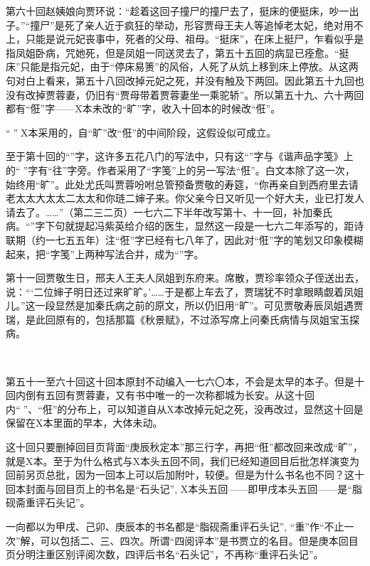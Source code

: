 \par 第六十回赵姨娘向贾环说：“趁着这回子撞尸的撞尸去了，挺床的便挺床，吵一出子。”“撞尸”是死了亲人近于疯狂的举动，形容贾母王夫人等追悼老太妃，绝对用不上，只能是说元妃丧事中，死者的父母、祖母。“挺床”，在床上挺尸，乍看似乎是指凤姐卧病，咒她死，但是凤姐一同送灵去了，第五十五回的病显已痊愈。“挺床”只能是指元妃，由于“停床易箦”的风俗，人死了从炕上移到床上停放。从这两句对白上看来，第五十八回改掉元妃之死，并没有触及下两回。因此第五十九回也没有改掉贾蓉妻，仍旧有“贾母带着贾蓉妻坐一乘驼轿”。所以第五十九、六十两回都有“俇”字——X本未改的“旷”字，收入十回本的时候改“俇”。
\par “𤞘”是X本采用的，自“旷”改“俇”的中间阶段，这假设似可成立。
\par 至于第十回的“\QuanWang ”字，这许多五花八门的写法中，只有这“\QuanWang ”字与《谐声品字笺》上的“𠉫”字有“往”字旁。作者采用了“字笺”上的另一写法“俇”。白文本除了这一次，始终用“旷”。此处尤氏叫贾蓉吩咐总管预备贾敬的寿筵，“你再亲自到西府里去请老太太大太太二太太和你琏二婶子来\QuanWang\QuanWang。你父亲今日又听见一个好大夫，业已打发人请去了。……”（第二三二页）一七六二下半年改写第十、十一回，补加秦氏病。“\QuanWang”字下句就提起冯紫英给介绍的医生，显然这一段是一七六二年添写的，距诗联期（约一七五五年）注“俇”字已经有七八年了，因此对“俇”字的笔划又印象模糊起来，把“字笺”上两种写法合并，成为“\QuanWang”字。
\par 第十一回贾敬生日，邢夫人王夫人凤姐到东府来。席散，贾珍率领众子侄送出去，说：“‘二位婶子明日还过来旷旷。'……于是都上车去了，贾瑞犹不时拿眼睛觑着凤姐儿。”这一段显然是加秦氏病之前的原文，所以仍旧用“旷”。可见贾敬寿辰凤姐遇贾瑞，是此回原有的，包括那篇《秋景赋》，不过添写席上问秦氏病情与凤姐宝玉探病。
\par  
\par 第五十一至六十回这十回本原封不动编入一七六〇本，不会是太早的本子。但是十回内倒有五回有贾蓉妻，又有书中唯一的一次称都城为长安。从这十回内“𤞘”、“俇”的分布上，可以知道自从X本改掉元妃之死，没再改过，显然这十回是保留在X本里面的早本，大体未动。
\par 这十回只要删掉回目页背面“庚辰秋定本”那三行字，再把“俇”都改回来改成“旷”，就是X本。至于为什么格式与X本头五回不同，我们已经知道回目后批怎样演变为回前另页总批，因为一回本上可以后加附叶，较便。但是为什么书名也不同？这十回本封面与回目页上的书名是“石头记”, X本头五回——即甲戌本头五回——是“脂砚斋重评石头记”。
\par 一向都以为甲戌、己卯、庚辰本的书名都是“脂砚斋重评石头记”, “重”作“不止一次”解，可以包括二、三、四次。所谓“四阅评本”是书贾立的名目。但是庚本回目页分明注重区别评阅次数，四评后书名“石头记”，不再称“重评石头记”。
